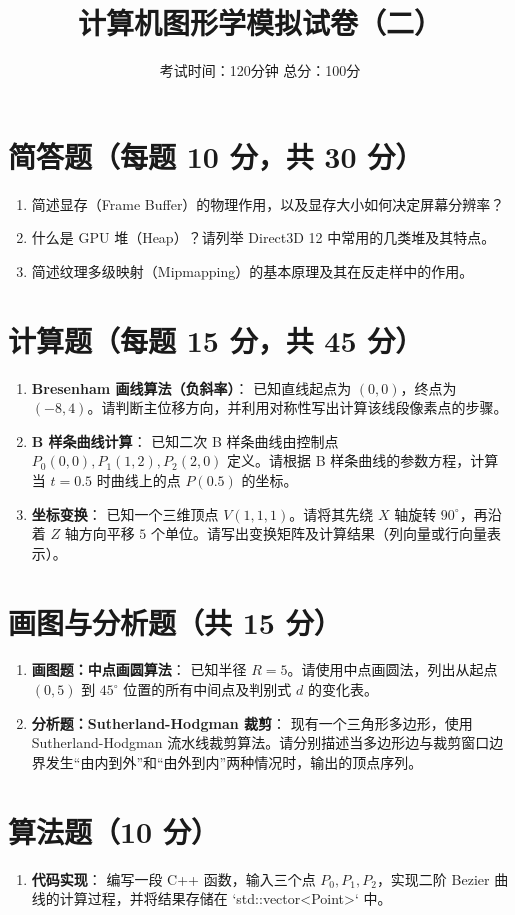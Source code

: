 \documentclass[UTF8]{ctexart}
\title{计算机图形学模拟试卷（二）}
\author{考试时间：120分钟 \quad 总分：100分}
\date{}
\begin{document}
\maketitle

\section{简答题（每题 10 分，共 30 分）}
\begin{enumerate}
    \item 简述显存（Frame Buffer）的物理作用，以及显存大小如何决定屏幕分辨率？
    \item 什么是 GPU 堆（Heap）？请列举 Direct3D 12 中常用的几类堆及其特点。
    \item 简述纹理多级映射（Mipmapping）的基本原理及其在反走样中的作用。
\end{enumerate}

\section{计算题（每题 15 分，共 45 分）}
\begin{enumerate}
    \item \textbf{Bresenham 画线算法（负斜率）}：
    已知直线起点为 $(0, 0)$，终点为 $(-8, 4)$。请判断主位移方向，并利用对称性写出计算该线段像素点的步骤。
    
    \item \textbf{B 样条曲线计算}：
    已知二次 B 样条曲线由控制点 $P_0(0,0), P_1(1,2), P_2(2,0)$ 定义。请根据 B 样条曲线的参数方程，计算当 $t = 0.5$ 时曲线上的点 $P(0.5)$ 的坐标。
    
    \item \textbf{坐标变换}：
    已知一个三维顶点 $V(1, 1, 1)$。请将其先绕 $X$ 轴旋转 $90^\circ$，再沿着 $Z$ 轴方向平移 $5$ 个单位。请写出变换矩阵及计算结果（列向量或行向量表示）。
\end{enumerate}

\section{画图与分析题（共 15 分）}
\begin{enumerate}
    \item \textbf{画图题：中点画圆算法}：
    已知半径 $R=5$。请使用中点画圆法，列出从起点 $(0, 5)$ 到 $45^\circ$ 位置的所有中间点及判别式 $d$ 的变化表。
    \item \textbf{分析题：Sutherland-Hodgman 裁剪}：
    现有一个三角形多边形，使用 Sutherland-Hodgman 流水线裁剪算法。请分别描述当多边形边与裁剪窗口边界发生“由内到外”和“由外到内”两种情况时，输出的顶点序列。
\end{enumerate}

\section{算法题（10 分）}
\begin{enumerate}
    \item \textbf{代码实现}：
    编写一段 C++ 函数，输入三个点 $P_0, P_1, P_2$，实现二阶 Bezier 曲线的计算过程，并将结果存储在 `std::vector<Point>` 中。
\end{enumerate}
\end{document}
